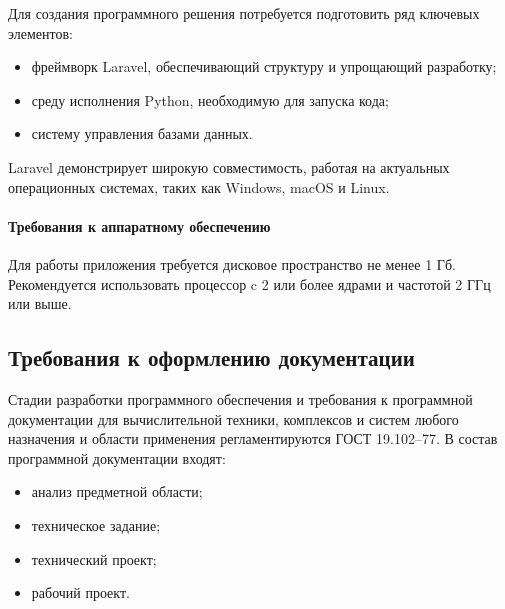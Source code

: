 Для создания программного решения потребуется подготовить ряд ключевых элементов: 
\begin{itemize}
\item фреймворк Laravel, обеспечивающий структуру и упрощающий разработку; 

\item среду исполнения Python, необходимую для запуска кода;

\item систему управления базами данных.
\end{itemize}
Laravel демонстрирует широкую совместимость, работая на актуальных операционных системах, таких как Windows, macOS и Linux.

\paragraph{Требования к аппаратному обеспечению}

Для работы приложения требуется дисковое пространство не менее 1 Гб. Рекомендуется использовать процессор c 2 или более ядрами и частотой 2 ГГц или выше.

\subsection{Требования к оформлению документации}

Стадии разработки программного обеспечения и требования к программной документации для вычислительной техники, комплексов и систем любого назначения и области применения регламентируются ГОСТ 19.102–77. В состав программной документации входят:
\begin{itemize}
\item	анализ предметной области;

\item	техническое задание;

\item	технический проект;

\item	рабочий проект.
\end{itemize}